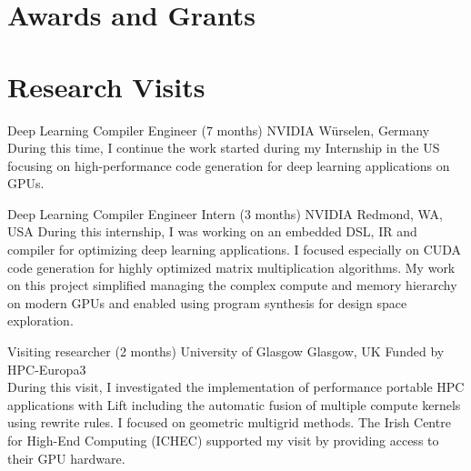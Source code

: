 \documentclass[11pt,a4paper,sans]{moderncv}        %
\begin{document}
\section{Awards and Grants}


\section{Research Visits}
					{Deep Learning Compiler Engineer (7 months)}
					{NVIDIA}
					{W\"urselen, Germany}{}
					{
                    During this time, I continue the work started during my Internship in the US focusing on high-performance code generation for deep learning applications on GPUs.
                    }

					{Deep Learning Compiler Engineer Intern (3 months)}
					{NVIDIA}
					{Redmond, WA, USA}{}
					{
                    During this internship, I was working on an embedded DSL, IR and compiler for optimizing deep learning applications.
                    I focused especially on CUDA code generation for highly optimized matrix multiplication algorithms.
                    My work on this project simplified managing the complex compute and memory hierarchy on modern GPUs and enabled using program synthesis for design space exploration.
                    }

					{Visiting researcher (2 months)}
					{University of Glasgow}
					{Glasgow, UK}{}
					{Funded by HPC-Europa3\\
                     During this visit, I investigated the implementation of performance portable HPC applications with Lift including the automatic fusion of multiple compute kernels using rewrite rules.
                     I focused on geometric multigrid methods. The Irish Centre for High-End Computing (ICHEC) supported my visit by providing access to their GPU hardware.
					}
\end{document}
